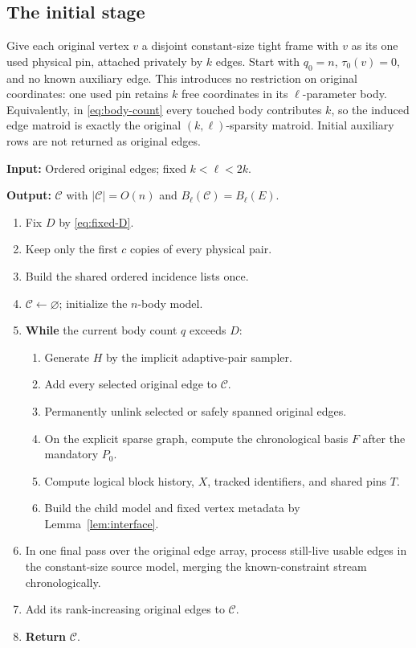 \documentclass[11pt,a4paper]{article}
\theoremstyle{definition}
\theoremstyle{remark}
\newcommand{\Bj}[2]{B_{#1}(#2)}
\begin{document}
\subsection{The initial stage}

Give each original vertex $v$ a disjoint constant-size
tight frame with $v$ as its one used physical pin,
attached privately by $k$ edges.
Start with $q_0=n$, $\tau_0(v)=0$, and no known
auxiliary edge.
This introduces no restriction on original coordinates:
one used pin retains $k$ free coordinates in its
$\ell$-parameter body.
Equivalently, in \eqref{eq:body-count} every touched
body contributes $k$, so the induced edge matroid
is exactly the original $(k,\ell)$-sparsity matroid.
Initial auxiliary rows are not returned as original edges.

\begin{algorithm}[htbp]
\caption{Uniform deterministic original-edge certificate}
\label{alg:complete}
\textbf{Input:} Ordered original edges; fixed $k<\ell<2k$.\par
\textbf{Output:} $\mathcal C$ with $|\mathcal C|=O(n)$ and
$\Bj\ell{\mathcal C}=\Bj\ell E$.
\begin{enumerate}[label=\arabic*:,leftmargin=2em,itemsep=2pt,topsep=4pt]
\item Fix $D$ by \eqref{eq:fixed-D}.
\item Keep only the first $c$ copies of every physical pair.
\item Build the shared ordered incidence lists once.
\item $\mathcal C\gets\varnothing$; initialize the $n$-body model.
\item \textbf{While} the current body count $q$ exceeds $D$:
\begin{enumerate}[label=\alph*.,leftmargin=1.5em,itemsep=2pt,topsep=2pt]
 \item Generate $H$ by the implicit adaptive-pair sampler.
 \item Add every selected original edge to $\mathcal C$.
 \item Permanently unlink selected or safely spanned original edges.
 \item On the explicit sparse graph, compute the chronological
 basis $F$ after the mandatory $P_0$.
 \item Compute logical block history, $X$, tracked identifiers,
 and shared pins $T$.
 \item Build the child model and fixed vertex metadata by
 Lemma~\ref{lem:interface}.
\end{enumerate}
\item In one final pass over the original edge array, process
 still-live usable edges in the constant-size source model,
 merging the known-constraint stream chronologically.
\item Add its rank-increasing original edges to $\mathcal C$.
\item \textbf{Return} $\mathcal C$.
\end{enumerate}
\end{algorithm}
\end{document}
